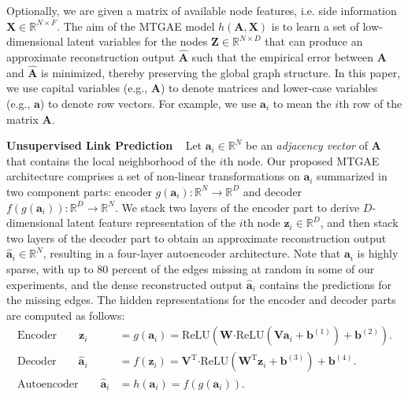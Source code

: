 \documentclass{article}
\begin{document}
Optionally, we are given a matrix of available node features, i.e. side information $\mathbf{X} \in \mathbb{R}^{N \times F}$. The aim of the MTGAE model $h(\mathbf{A,X})$ is to learn a set of low-dimensional latent variables for the nodes $\mathbf{Z} \in \mathbb{R}^{N \times D}$ that can produce an approximate reconstruction output $\mathbf{\hat{A}}$ such that the empirical error between $\mathbf{A}$ and $\mathbf{\hat{A}}$ is minimized, thereby preserving the global graph structure. In this paper, we use capital variables (e.g., $\mathbf{A}$) to denote matrices and lower-case variables (e.g., $\mathbf{a}$) to denote row vectors. For example, we use $\mathbf{a}_i$ to mean the $i$th row of the matrix $\mathbf{A}$.

\noindent \textbf{Unsupervised Link Prediction} ~ Let $\mathbf{a}_i \in \mathbb{R}^N$ be an \emph{adjacency vector} of $\mathbf{A}$ that contains the local neighborhood of the $i$th node. Our proposed MTGAE architecture comprises a set of non-linear transformations on $\mathbf{a}_i$ summarized in two component parts: encoder $g(\mathbf{a}_i)\colon \mathbb{R}^N \to \mathbb{R}^D$ and decoder $f\left(g\left(\mathbf{a}_i\right)\right)\colon \mathbb{R}^D \to \mathbb{R}^N$. We stack two layers of the encoder part to derive $D$-dimensional latent feature representation of the $i$th node $\mathbf{z}_i \in \mathbb{R}^D$, and then stack two layers of the decoder part to obtain an approximate reconstruction output $\mathbf{\hat{a}}_i \in \mathbb{R}^N$, resulting in a four-layer autoencoder architecture. Note that $\mathbf{a}_i$ is highly sparse, with up to 80 percent of the edges missing at random in some of our experiments, and the dense reconstructed output $\mathbf{\hat{a}}_i$ contains the predictions for the missing edges. The hidden representations for the encoder and decoder parts are computed as follows:
\begin{align*}
\text{Encoder} \qquad \mathbf{z}_i &= g\left(\mathbf{a}_i\right) = \text{ReLU}\left(\mathbf{W} \boldsymbol{\cdot} \text{ReLU}\left(\mathbf{V}\mathbf{a}_i + \mathbf{b}^{(1)}\right) + \mathbf{b}^{(2)}\right). \\
\text{Decoder} \qquad \mathbf{\hat{a}}_i &= f\left(\mathbf{z}_i\right) = \mathbf{V}^\text{T} \boldsymbol{\cdot} \text{ReLU}\left(\mathbf{W}^\text{T}\mathbf{z}_i + \mathbf{b}^{(3)}\right) + \mathbf{b}^{(4)}. \\
\text{Autoencoder} \qquad \mathbf{\hat{a}}_i &= h\left(\mathbf{a}_i\right) = f\left(g\left(\mathbf{a}_i\right)\right).
\end{align*}
\end{document}
